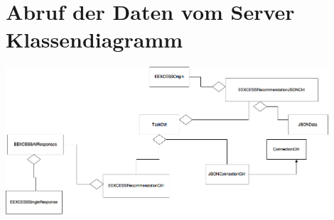 \documentclass[a4paper,10pt]{article}
\begin{document}
\section{Abruf der Daten vom Server Klassendiagramm}

\includegraphics[width=12cm]{Pics/Klassendiagramm_Anfrage}
\end{document}
